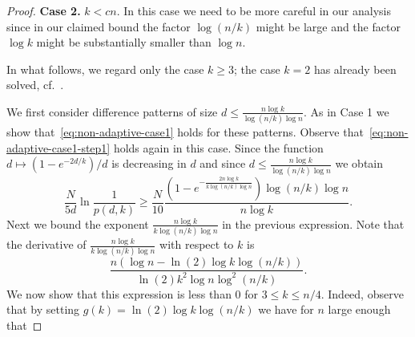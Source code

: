 \documentclass[english,a4paper,11pt]{article}
\newcommand{\comment}[1]{{\bf [#1]}}
\newcommand{\CW}[1]{\comment{\textcolor{blue}{CW: #1}}}
\begin{document}
{\begin{proof}
\textbf{Case 2.} $k < c n$. In this case we need to be more careful in our analysis since in our claimed bound the factor $\log(n/k)$ might be large and the factor $\log k$ might be substantially smaller than $\log n$. 

In what follows, we regard only the case $k \ge 3$; the case $k=2$ has already been solved, cf.~\cite{Erd63}.

We first consider difference patterns of size $d \le \frac{n \log k}{\log(n/k) \log n}$. As in Case 1 we show that~\eqref{eq:non-adaptive-case1} holds for these patterns. Observe that~\eqref{eq:non-adaptive-case1-step1} holds again in this case. Since
the function $d \mapsto (1-e^{-2d/k})/d$ is %
decreasing in $d$ and since $d \le \frac{n \log k}{\log(n/k) \log n}$ we obtain
\begin{equation} \label{eq:non-adaptive-continue-bla}
\frac{N}{5d} \ln \frac{1}{p(d,k)} \ge \frac{N}{10} \frac{(1-e^{-\frac{2n \log k}{k \log(n/k) \log n}}) \log(n/k) \log n}{n \log k}.
\end{equation}
Next we bound the exponent $\frac{n \log k}{k \log(n/k) \log n}$ in the previous expression. Note that the derivative of $\frac{n \log k}{k \log(n/k) \log n}$ with respect to $k$ is
\begin{equation} \label{eq:non-adaptive-exponent}
\frac{ n ( \log n - \ln(2) \log k \log (n/k))}{\ln(2) k^2 \log n \log^2(n/k)}.
\end{equation}
We now show that this expression is 
less than 0 for 
$3 \le k \le n/4$. %
Indeed, observe that by setting $g(k) = \ln(2) \log k \log(n/k)$ we have for $n$ large enough that

\end{proof}}
\end{document}
